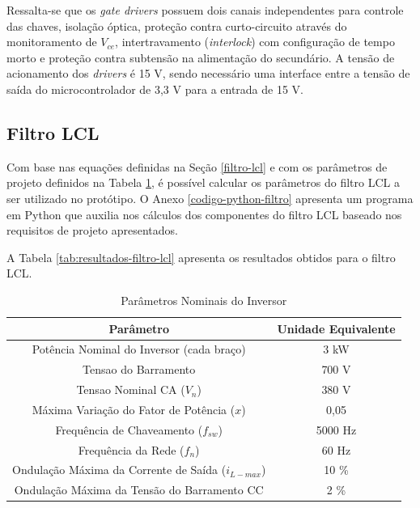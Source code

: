 Ressalta-se que os \textit{gate drivers} possuem dois canais independentes para controle das chaves, isolação óptica, proteção contra curto-circuito através do monitoramento de $V_{ce}$, intertravamento (\textit{interlock}) com configuração de tempo morto e proteção contra subtensão na alimentação do secundário.
A tensão de acionamento dos \textit{drivers} é 15 V, sendo necessário uma interface entre a tensão de saída do microcontrolador de 3,3 V para a entrada de 15 V.

\subsection{Filtro LCL}

Com base nas equações definidas na Seção \ref{filtro-lcl} e com os parâmetros de projeto definidos na Tabela \ref{tab:parametros-inversor}, é possível calcular os parâmetros do filtro LCL a ser utilizado no protótipo.
O Anexo \ref{codigo-python-filtro} apresenta um programa em Python que auxilia nos cálculos dos componentes do filtro LCL baseado nos requisitos de projeto apresentados.

A Tabela \ref{tab:resultados-filtro-lcl} apresenta os resultados obtidos para o filtro LCL.

\begin{table}[h]
	\centering
	\caption{Parâmetros Nominais do Inversor}
	\label{tab:parametros-inversor}
	
	\begin{tabular}{cc}
		\toprule
		\textbf{Parâmetro} & \textbf{Unidade Equivalente} \\
		\midrule
		Potência Nominal do Inversor (cada braço) & 3 kW \\
		Tensao do Barramento & 700 V \\
		Tensao Nominal CA ($V_n$) & 380 V \\
		Máxima Variação do Fator de Potência ($x$) & 0,05 \\
		Frequência de Chaveamento ($f_{sw}$) & 5000 Hz \\
		Frequência da Rede ($f_n$) & 60 Hz \\
		Ondulação Máxima da Corrente de Saída ($i_{L-max}$) &  10 \% \\
		Ondulação Máxima da Tensão do Barramento CC & 2 \% \\
		\bottomrule
	\end{tabular}
\end{table}


